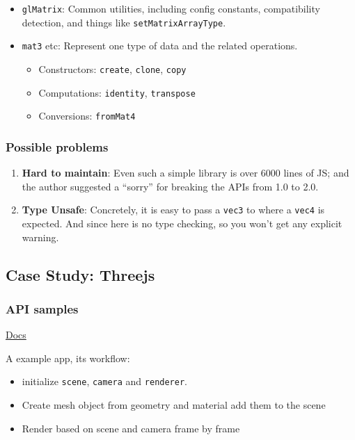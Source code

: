 \documentclass[]{article}
\begin{document}
\begin{itemize}
\itemsep1pt\parskip0pt
\item
  \texttt{glMatrix}: Common utilities, including config constants,
  compatibility detection, and things like \texttt{setMatrixArrayType}.
\item
  \texttt{mat3} etc: Represent one type of data and the related
  operations.

  \begin{itemize}
  \itemsep1pt\parskip0pt
  \item
    Constructors: \texttt{create}, \texttt{clone}, \texttt{copy}
  \item
    Computations: \texttt{identity}, \texttt{transpose}
  \item
    Conversions: \texttt{fromMat4}
  \end{itemize}
\end{itemize}

\subsubsection{Possible problems}\label{possible-problems}

\begin{enumerate}
\def\labelenumi{\arabic{enumi}.}
\itemsep1pt\parskip0pt
\item
  \textbf{Hard to maintain}: Even such a simple library is over 6000
  lines of JS; and the author suggested a ``sorry'' for breaking the
  APIs from 1.0 to 2.0.
\item
  \textbf{Type Unsafe}: Concretely, it is easy to pass a \texttt{vec3}
  to where a \texttt{vec4} is expected. And since here is no type
  checking, so you won't get any explicit warning.
\end{enumerate}

\subsection{Case Study: Threejs}\label{case-study-threejs}

\subsubsection{API samples}\label{api-samples}

\href{http://threejs.org/docs/}{Docs}

A example app, its workflow:

\begin{itemize}
\itemsep1pt\parskip0pt
\item
  initialize \texttt{scene}, \texttt{camera} and \texttt{renderer}.
\item
  Create mesh object from geometry and material add them to the scene
\item
  Render based on scene and camera frame by frame
\end{itemize}
\end{document}
